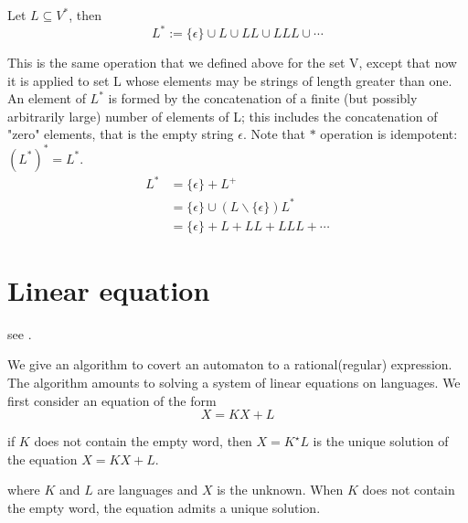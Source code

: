 \begin{definition}
	Let $L\subseteq V^{\ast}$, then 
	$$L^{\ast} := \{\epsilon\}\cup L \cup LL\cup LLL\cup \cdots$$ 
\end{definition}

This is the same operation that we defined above for the set V, except that now it is applied to set L whose elements may be strings of length greater than one. An element of $L^*$ is formed by the concatenation of a finite (but possibly arbitrarily large) number of elements of L; this includes the concatenation of "zero" elements, that is the empty string $\epsilon$. Note that $\ast$ operation is idempotent: ${(L^*)}^* = L^*$.
\begin{align*}
L^{\ast} &= \{\epsilon\} +L^{+} \\
&=  \{\epsilon\}\cup (L\backslash \{\epsilon\})L^{\ast}\\ &=\{\epsilon\} + L + LL + LLL + \cdots 
\end{align*}

\section{Linear equation}

see \cite[5.3,p64]{Jean2018}.

We give an algorithm to covert an automaton to a rational(regular) expression. The algorithm amounts to solving a system of linear equations on languages. We first consider an equation of the form
\begin{equation}\label{Linear equation}
X = KX + L
\end{equation}

\begin{proposition}
	if $K$ does not contain the empty word, then $X = K^\star L$ is the unique solution of the equation $X = KX + L$.
\end{proposition}
where $K$ and $L$ are languages and $X$ is the unknown. When $K$ does not contain the empty word, the equation admits a unique solution.

